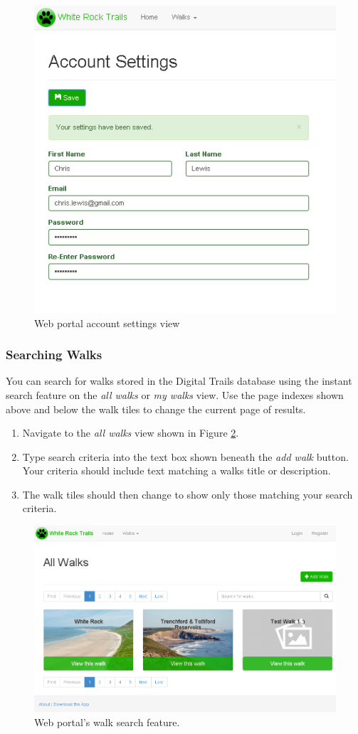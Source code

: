 \documentclass[11pt,a4paper]{report}
\begin{document}
\begin{figure}[h]
\centering
\includegraphics[width=0.7\linewidth]{./img/webportal/user-account}
\caption{Web portal account settings view}
\label{fig:user-account-guide}
\end{figure}


\subsubsection{Searching Walks}

You can search for walks stored in the Digital Trails database using the instant search feature on the \emph{all walks} or \emph{my walks} view. Use the page indexes shown above and below the walk tiles to change the current page of results.

\begin{enumerate}
\item Navigate to the \emph{all walks} view shown in Figure \ref{fig:all-walks-guide}.
\item Type search criteria into the text box shown beneath the \emph{add walk} button. Your criteria should include text matching a walks title or description.
\item The walk tiles should then change to show only those matching your search criteria.
\end{enumerate}

\begin{figure}[H]
\centering
\includegraphics[width=0.8\linewidth]{./img/webportal/all-walks}
\caption{Web portal's walk search feature.}
\label{fig:all-walks-guide}
\end{figure}
\end{document}

